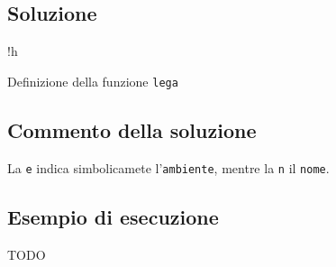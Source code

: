 \subsection{Soluzione}

\begin{listing}{!h}
\caption[]{Definizione della funzione \texttt{lega}}
\end{listing}

\subsection{Commento della soluzione}

La \texttt{e} indica simbolicamete l'\texttt{ambiente}, mentre la \texttt{n} il \texttt{nome}.

\subsection*{Esempio di esecuzione}

TODO
